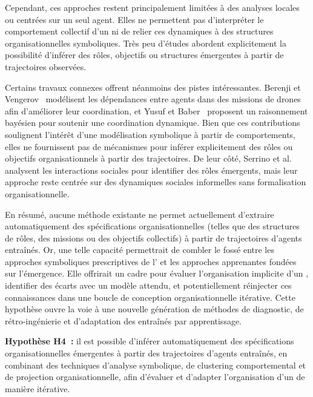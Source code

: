 Cependant, ces approches restent principalement limitées à des analyses locales ou centrées sur un seul agent. Elles ne permettent pas d'interpréter le comportement collectif d'un  ni de relier ces dynamiques à des structures organisationnelles symboliques. Très peu d'études abordent explicitement la possibilité d'inférer des rôles, objectifs ou structures émergentes à partir de trajectoires observées.

Certains travaux connexes offrent néanmoins des pistes intéressantes. Berenji et Vengerov~\cite{berenji2000learning} modélisent les dépendances entre agents dans des missions de drones afin d'améliorer leur coordination, et Yusuf et Baber~\cite{yusuf2020inferential} proposent un raisonnement bayésien pour soutenir une coordination dynamique. Bien que ces contributions soulignent l'intérêt d'une modélisation symbolique à partir de comportements, elles ne fournissent pas de mécanismes pour inférer explicitement des rôles ou objectifs organisationnels à partir des trajectoires. De leur côté, Serrino et al.~\cite{serrino2019finding} analysent les interactions sociales pour identifier des rôles émergents, mais leur approche reste centrée sur des dynamiques sociales informelles sans formalisation organisationnelle.

En résumé, aucune méthode existante ne permet actuellement d'extraire automatiquement des spécifications organisationnelles (telles que des structures de rôles, des missions ou des objectifs collectifs) à partir de trajectoires d'agents entraînés. Or, une telle capacité permettrait de combler le fossé entre les approches symboliques prescriptives de l' et les approches apprenantes fondées sur l'émergence. Elle offrirait un cadre pour évaluer l'organisation implicite d'un , identifier des écarts avec un modèle attendu, et potentiellement réinjecter ces connaissances dans une boucle de conception organisationnelle itérative. Cette hypothèse ouvre la voie à une nouvelle génération de méthodes de diagnostic, de rétro-ingénierie et d'adaptation des  entraînés par apprentissage.

\medskip

\noindent
\textbf{Hypothèse H4~:} il est possible d'inférer automatiquement des spécifications organisationnelles émergentes à partir des trajectoires d'agents entraînés, en combinant des techniques d'analyse symbolique, de clustering comportemental et de projection organisationnelle, afin d'évaluer et d'adapter l'organisation d'un  de manière itérative.


